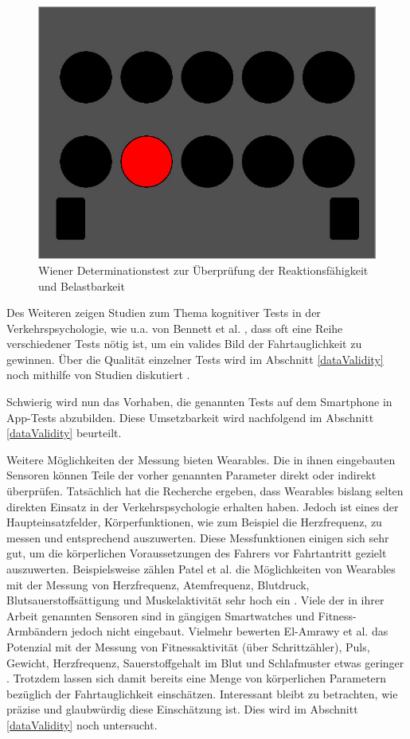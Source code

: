 \begin{figure}[H]
\centering
\includegraphics[width=0.7\linewidth]{images/wiener_dt}
\caption[Caption for parameters]{Wiener Determinationstest zur Überprüfung der Reaktionsfähigkeit und Belastbarkeit\footnotemark}
\label{fig:wiener_dt}
\end{figure}

Des Weiteren zeigen Studien zum Thema kognitiver Tests in der Verkehrspsychologie, wie u.a. von Bennett et al. \cite{cognitivetestsfitnesstodrive}, dass oft eine Reihe verschiedener Tests nötig ist, um ein valides Bild der Fahrtauglichkeit zu gewinnen. Über die Qualität einzelner Tests wird im Abschnitt \ref{dataValidity} noch mithilfe von Studien diskutiert \cite{cognitivetestsfitnesstodrive, reviewofassessmenttests, studieaufmerksamkeitstests, indiaassessment}.

Schwierig wird nun das Vorhaben, die genannten Tests auf dem Smartphone in App-Tests abzubilden. Diese Umsetzbarkeit wird nachfolgend im Abschnitt \ref{dataValidity} beurteilt.

Weitere Möglichkeiten der Messung bieten Wearables. Die in ihnen eingebauten Sensoren können Teile der vorher genannten Parameter direkt oder indirekt überprüfen. Tatsächlich hat die Recherche ergeben, dass Wearables bislang selten direkten Einsatz in der Verkehrspsychologie erhalten haben. Jedoch ist eines der Haupteinsatzfelder, Körperfunktionen, wie zum Beispiel die Herzfrequenz, zu messen und entsprechend auszuwerten. Diese Messfunktionen einigen sich sehr gut, um die körperlichen Voraussetzungen des Fahrers vor Fahrtantritt gezielt auszuwerten. Beispielsweise zählen Patel et al. die Möglichkeiten von Wearables mit der Messung von Herzfrequenz, Atemfrequenz, Blutdruck, Blutsauerstoffsättigung und Muskelaktivität sehr hoch ein \cite{reviewwearablesensors}. Viele der in ihrer Arbeit genannten Sensoren sind in gängigen Smartwatches und Fitness-Armbändern jedoch nicht eingebaut. Vielmehr bewerten  El-Amrawy et al. das Potenzial mit der Messung von Fitnessaktivität (über Schrittzähler), Puls, Gewicht, Herzfrequenz, Sauerstoffgehalt im Blut und Schlafmuster etwas geringer \cite{wearabletracking}. Trotzdem lassen sich damit bereits eine Menge von körperlichen Parametern bezüglich der Fahrtauglichkeit einschätzen. Interessant bleibt zu betrachten, wie präzise und glaubwürdig diese Einschätzung ist. Dies wird im Abschnitt \ref{dataValidity} noch untersucht.

